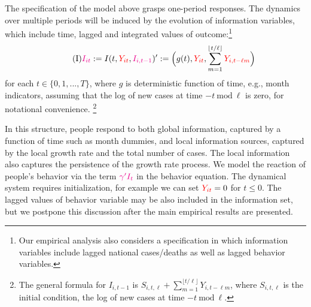 \documentclass[11pt,reqno,letter]{amsart}
\theoremstyle{definition}
\def\icolor{\color{magenta}}
\def\ycolor{\color{red}}
\begin{document}


The specification of the model above grasps one-period responses.  The dynamics over multiple periods will be induced by the evolution
of information variables, which include time, lagged and integrated values of outcome:\footnote{Our empirical analysis also considers a specification in which information variables include lagged national cases/deaths as well as lagged behavior variables.}
\begin{equation}\label{eq:I}\tag{I}
 {\icolor I_{it} } := I(t, {\ycolor Y_{it}},  { \icolor  I_{i, t-1} })' := \Big (g(t) , {\ycolor Y_{it}},  \sum_{m=1}^{ \lfloor t/\ell \rfloor}
{\ycolor Y_{i,t - \ell m}} \Big )  \end{equation}
 for  each  $t \in \{0,1,...,T\}$, where $g$ is deterministic function of time, e.g., month indicators,
 assuming that the log of new cases at time $ - t \ \mathrm{mod} \ \ell $ is zero, for notational convenience.
 \footnote{The general formula  for  $I_{i, t-1}$ is $
S_{i, t, \ell } + \sum_{m=1}^{ \lfloor t/\ell \rfloor} Y_{i,t - \ell m}$, where $ S_{i, t, \ell }$ is the initial condition, the log of new cases at time $- t \ \mathrm{ mod } \ \ell$.}

 
 


In this structure, people respond to both global information, captured by a function of time such as month dummies, and local information sources, captured by the local growth rate and the total number of cases. The local information also captures the persistence of the growth rate process.  We model the reaction of people's behavior via the term ${\icolor \gamma'I_{t}}$ in the behavior equation.  The dynamical system requires initialization, for example we can set  ${\ycolor Y_{it}} = 0$ for $t \leq 0$. The  lagged values of behavior variable may be also included in the information set, but we postpone this discussion after the main empirical results are presented.
\end{document}
